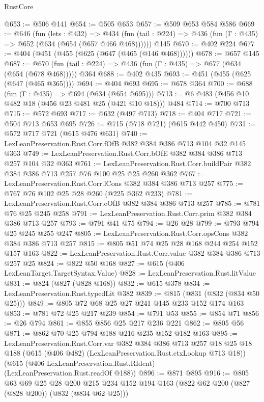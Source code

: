 \begin{lexlean}{RustCore}
\begin{coremodule}
@653 := @506 @141
@654 := @505 @653
@657 := @509 @653 @584 @586
@669 := @646
    (fun (lets : @432) =>
    @434 (fun (tail : @224) => @436 (fun (Γ : @435) => @652 (@634 (@654 (@657 @466 @468))))))
    @145
@670 := @402 @224
@677 := @404 (@451 (@455 (@625 (@647 (@465 (@146 @468))))))
@678 := @657 @145
@687 := @670 (fun (tail : @224) => @436 (fun (Γ : @435) => @677 (@634 (@654 (@678 @468))))) @364
@688 := @402 @435
@693 := @451 (@455 (@625 (@647 (@465 @365))))
@694 := @404 @693
@695 := @678 @364
@700 := @688 (fun (Γ : @435) => @694 (@634 (@654 @695)))
@713 := @6 @483 (@456 @10 @482 @18 (@456 @23 @481 @25 (@421 @10 @18))) @484
@714 := @700 @713
@715 := @572 @693
@717 := @632 (@497 @713)
@718 := @404 @717
@721 := @504 @713 @653 @695
@726 := @715 (@718 @721) (@615 @442 @450)
@731 := @572 @717 @721 (@615 @476 @631)
@740 := LexLeanPreservation.Rust.Corr.fOfB @382 @384 @386 @713 @104 @32 @145 @363
@749 := LexLeanPreservation.Rust.Corr.bOfE @382 @384 @386 @713 @257 @104 @32 @363
@761 := LexLeanPreservation.Rust.Corr.buildPair @382 @384 @386 @713 @257 @76 @100 @25 @25 @260 @362
@767 := LexLeanPreservation.Rust.Corr.lCons @382 @384 @386 @713 @257
@775 := @767 @76 @102 @25 @28 @260 (@225 @362 @233)
@781 := LexLeanPreservation.Rust.Corr.eOfB @382 @384 @386 @713 @257
@785 := @781 @76 @25 @245 @258
@791 := LexLeanPreservation.Rust.Corr.prim @382 @384 @386 @713 @257
@793 := @791 @41 @75
@794 := @26 @28
@799 := @793 @794 @25 @245 @255 @247
@805 := LexLeanPreservation.Rust.Corr.opsCons @382 @384 @386 @713 @257
@815 := @805 @51 @74 @25 @28 @168 @244 @254 @152 @157 @163
@822 := LexLeanPreservation.Rust.Corr.value @382 @384 @386 @713 @257 @25
@824 := @822 @50 @168
@827 := @615 (@406 LexLeanTarget.TargetSyntax.Value)
@828 := LexLeanPreservation.Rust.litValue
@831 := @824 (@827 (@828 @168))
@832 := @615 @378
@834 := LexLeanPreservation.Rust.typedLit @382
@839 := @815 (@831 (@832 (@834 @50 @25)))
@849 := @805 @72 @68 @25 @27 @241 @145 @233 @152 @174 @163
@853 := @781 @72 @25 @217 @239
@854 := @791 @53
@855 := @854 @71
@856 := @26 @794
@861 := @855 @856 @25 @217 @236 @221
@862 := @805 @56
@871 := @862 @70 @25 @794 @188 @216 @235 @152 @182 @163
@895 := LexLeanPreservation.Rust.Corr.var
    @382
    @384
    @386
    @713
    @257
    @18
    @25
    @18
    @188
    (@615 (@406 @482) (LexLeanPreservation.Rust.ctxLookup @713 @18))
    (@615 (@406 LexLeanPreservation.Rust.RIdent) (LexLeanPreservation.Rust.readOf @188))
@896 := @871 @895
@916 := @805
    @63
    @69
    @25
    @28
    @200
    @215
    @234
    @152
    @194
    @163
    (@822 @62 @200 (@827 (@828 @200)) (@832 (@834 @62 @25)))

\end{coremodule}
\end{lexlean}

